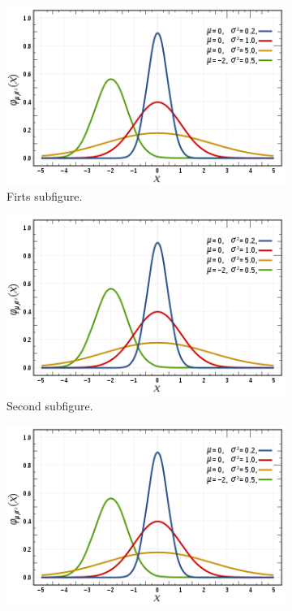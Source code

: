 \begin{figure}[!htb]
    \centering
    \begin{subfigure}{0.4\textwidth}
        \includegraphics[width=\textwidth]{figures/gambar.png}
        \caption{Firts subfigure.}
        \label{fig:first_nospace}
    \end{subfigure}
    \begin{subfigure}{0.4\textwidth}
        \includegraphics[width=\textwidth]{figures/gambar.png}
        \caption{Second subfigure.}
        \label{fig:second_nospace}
    \end{subfigure}
    \begin{subfigure}{0.4\textwidth}
        \includegraphics[width=\textwidth]{figures/gambar.png}

\end{subfigure}
\end{figure}
